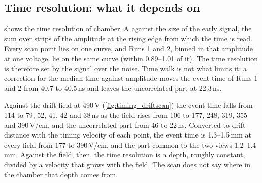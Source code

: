 \subsection{Time resolution: what it depends on}\label{app:timingdetails}
 shows the time resolution of chamber~A against the size of the early signal, the sum over strips of
the amplitude at the rising edge from which the time is read. Every scan point lies on one curve, and Runs 1 and 2,
binned in that amplitude at one voltage, lie on the same curve (within 0.89--1.01 of it). The time resolution is
therefore set by the signal over the noise. Time walk is not what limits it: a correction for the median time against
amplitude moves the event time of Runs 1 and 2 from 40.7 to 40.5\,ns and leaves the uncorrelated part at 22.3\,ns.

Against the drift field at 490\,V (\cref{fig:timing_driftscan}) the event time falls from 114 to 79, 52, 41, 42 and
38\,ns as the field rises from 106 to 177, 248, 319, 355 and 390\,V/cm, and the uncorrelated part from 46 to 22\,ns.
Converted to drift distance with the timing velocity of each point, the event time is 1.3--1.5\,mm at every field from
177 to 390\,V/cm, and the part common to the two views 1.2--1.4\,mm. Against the field, then, the time resolution is a
depth, roughly constant, divided by a velocity that grows with the field. The scan does not say where in the chamber
that depth comes from.

